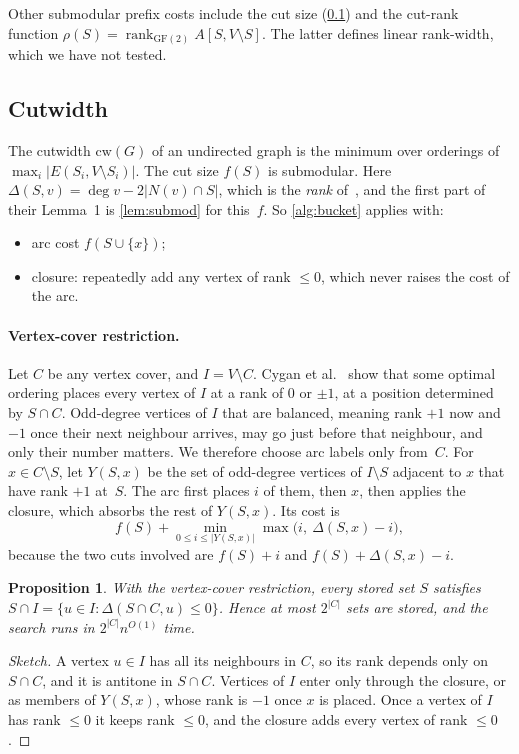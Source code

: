 \documentclass[11pt]{article}
\newtheorem{proposition}[theorem]{Proposition}
\theoremstyle{definition}
\newcommand{\set}[1]{\{#1\}}
\begin{document}
Other submodular prefix costs include the cut size (\cref{sec:cutwidth})
and the cut-rank function $\rho(S)=\operatorname{rank}_{\mathrm{GF}(2)}A[S,V\setminus
S]$. The latter defines linear rank-width, which we have not tested.

\subsection{Cutwidth}\label{sec:cutwidth}

The cutwidth $\mathrm{cw}(G)$ of an undirected graph is the minimum over
orderings of $\max_i|E(S_i,V\setminus S_i)|$. The cut size $f(S)$ is
submodular. Here $\Delta(S,v)=\deg v-2|N(v)\cap S|$, which is the
\emph{rank} of~\cite{CLPPS14}, and the first part of their Lemma~1 is
\cref{lem:submod} for this~$f$. So \cref{alg:bucket} applies with:
\begin{itemize}
\item arc cost $f(S\cup\set x)$;
\item closure: repeatedly add any vertex of rank $\le0$, which never raises
the cost of the arc.
\end{itemize}

\paragraph{Vertex-cover restriction.} Let $C$ be any vertex cover, and
$I=V\setminus C$. Cygan et al.~\cite[Lemma~2]{CLPPS14} show that some
optimal ordering places every vertex of $I$ at a rank of $0$ or $\pm1$, at
a position determined by $S\cap C$. Odd-degree vertices of $I$ that are
balanced, meaning rank $+1$ now and $-1$ once their next neighbour arrives,
may go just before that neighbour, and only their number matters. We
therefore choose arc labels only from~$C$. For $x\in C\setminus S$, let
$Y(S,x)$ be the set of odd-degree vertices of $I\setminus S$ adjacent to
$x$ that have rank $+1$ at~$S$. The arc first places $i$ of them, then $x$,
then applies the closure, which absorbs the rest of $Y(S,x)$. Its cost is
\[
f(S)+\min_{0\le i\le|Y(S,x)|}\max\bigl(i,\ \Delta(S,x)-i\bigr),
\]
because the two cuts involved are $f(S)+i$ and $f(S)+\Delta(S,x)-i$.

\begin{proposition}\label{prop:cw2tau}
With the vertex-cover restriction, every stored set $S$ satisfies $S\cap
I=\set{u\in I:\Delta(S\cap C,u)\le0}$. Hence at most $2^{|C|}$ sets are
stored, and the search runs in $2^{|C|}n^{O(1)}$ time.
\end{proposition}
\begin{proof}[Sketch]
A vertex $u\in I$ has all its neighbours in $C$, so its rank depends only
on $S\cap C$, and it is antitone in $S\cap C$. Vertices of $I$ enter only
through the closure, or as members of $Y(S,x)$, whose rank is $-1$ once $x$
is placed. Once a vertex of $I$ has rank $\le0$ it keeps rank $\le0$, and
the closure adds every vertex of rank $\le0$.
\end{proof}
\end{document}

